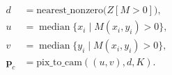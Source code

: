 \begin{align*}
    d &= \text{nearest\_nonzero}\bigl(Z[M>0]\bigr),\\
    u &= \operatorname{median}\{x_i \mid M(x_i,y_i)>0\},\\
    v &= \operatorname{median}\{y_i \mid M(x_i,y_i)>0\},\\
    \mathbf{p}_c &= \text{pix\_to\_cam}((u,v), d, K).
\end{align*}
